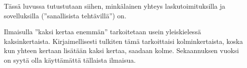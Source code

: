 Tässä luvussa tutustutaan siihen, minkälainen yhteys laskutoimituksilla ja sovelluksilla (''sanallisista tehtävillä'') on.


Ilmaisulla ''kaksi kertaa enemmän'' tarkoitetaan usein yleiskielessä kaksinkertaista. Kirjaimellisesti tulkiten tämä tarkoittaisi kolminkertaista, koska kun yhteen kertaan lisätään kaksi kertaa, saadaan kolme. Sekaannuksen vuoksi on syytä olla käyttämättä tällaista ilmaisua.


